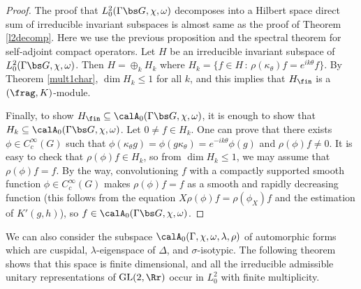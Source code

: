 \begin{proof}
The proof that $L_{0}^{2}(\Gamma \bs G, \chi, \omega)$ decomposes into a Hilbert space direct sum of irreducible invariant subspaces is almost same as the proof of Theorem \ref{l2decomp}. Here we use the previous proposition and the spectral theorem for self-adjoint compact operators. 
Let $H$ be an irreducible invariant subspace of $L_{0}^{2}(\Gamma \bs G, \chi, \omega)$. 
Then $H = \oplus_{k} H_{k}$ where $H_{k} = \{f\in H\,:\, \rho(\kappa_{\theta})f = e^{ik\theta}f\}$. 
By Theorem \ref{mult1char}, $\dim H_{k} \leq 1$ for all $k$, and this implies that $H_{\fin}$ is a $(\frag, K)$-module. 

Finally, to show $H_{\fin} \subseteq \calA_{0}(\Gamma\bs G, \chi, \omega)$, it is enough to show that $H_{k} \subseteq \calA_{0}(\Gamma\bs G, \chi, \omega)$. 
Let $0\neq f\in H_k$. 
One can prove that there exists $\phi\in C_{c}^{\infty}(G)$ such that $\phi(\kappa_{\theta}g) = \phi(g\kappa_{\theta}) = e^{-ik\theta}\phi(g)$ and $\rho(\phi)f \neq 0$. 
It is easy to check that $\rho(\phi)f\in H_k$, so from $\dim H_k \leq 1$, we may assume that $\rho(\phi) f = f$. 
By the way, convolutioning $f$ with a compactly supported smooth function $\phi\in C_{c}^{\infty}(G)$ makes $\rho(\phi)f = f$ as a smooth and rapidly decreasing function (this follows from the equation $X\rho(\phi)f = \rho(\phi_X)f$ and the estimation of $K'(g, h)$), so $f\in \calA_{0}(\Gamma \bs G, \chi, \omega)$. 
\end{proof}


We can also consider the subspace $\calA_{0}(\Gamma, \chi, \omega, \lambda, \rho)$ of automorphic forms which are cuspidal, $\lambda$-eigenspace of $\Delta$, and $\sigma$-isotypic. 
The following theorem shows that this space is finite dimensional, and all the irreducible admissible unitary representations of $\GL(2, \Rr)$ occur in $L^{2}_{0}$ with finite multiplicity. 

